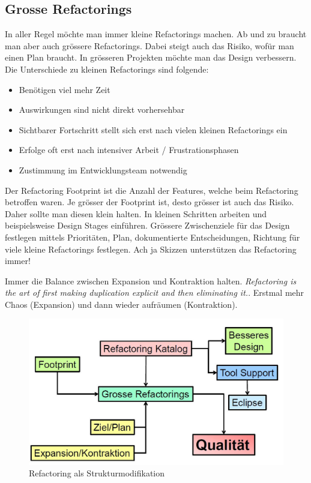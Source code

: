 \subsection{Grosse Refactorings}
In aller Regel möchte man immer kleine Refactorings machen. Ab und zu braucht man aber auch grössere Refactorings. Dabei steigt auch das Risiko, wofür man einen Plan braucht. In grösseren Projekten möchte man das Design verbessern. Die Unterschiede zu kleinen Refactorings sind folgende:

\begin{itemize}
	\item Benötigen viel mehr Zeit
	\item Auswirkungen sind nicht direkt vorhersehbar
	\item Sichtbarer Fortschritt stellt sich erst nach vielen kleinen Refactorings ein
	\item Erfolge oft erst nach intensiver Arbeit / Frustrationsphasen
	\item Zustimmung im Entwicklungsteam notwendig
\end{itemize}

Der Refactoring Footprint ist die Anzahl der Features, welche beim Refactoring betroffen waren. Je grösser der Footprint ist, desto grösser ist auch das Risiko. Daher sollte man diesen klein halten. In kleinen Schritten arbeiten und beispielsweise Design Stages einführen. Grössere Zwischenziele für das Design festlegen mittels Prioritäten, Plan, dokumentierte Entscheidungen, Richtung für viele kleine Refactorings festlegen. Ach ja Skizzen unterstützen das Refactoring immer! 

Immer die Balance zwischen Expansion und Kontraktion halten. \textit{Refactoring is the art of first making duplication explicit and then eliminating it.}. Erstmal mehr Chaos (Expansion) und dann wieder aufräumen (Kontraktion).

\begin{figure}[h!]
	\centering
	\includegraphics[width=0.7\linewidth]{fig/refactoring-als-strukturmodifikation}
	\caption{Refactoring als Strukturmodifikation}
	\label{fig:refactoring-als-strukturmodifikation}
\end{figure}

